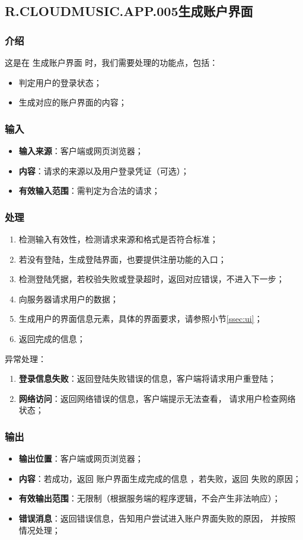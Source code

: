 \subsection{R.CLOUDMUSIC.APP.005生成账户界面}
\subsubsection{介绍}
	这是在 生成账户界面 时，我们需要处理的功能点，包括：
	\begin{itemize}
		\item 判定用户的登录状态；
		\item 生成对应的账户界面的内容；
	\end{itemize}
\subsubsection{输入}
	\begin{itemize}
		\item \textbf{输入来源}：客户端或网页浏览器；
		\item \textbf{内容}：请求的来源以及用户登录凭证（可选）；
		\item \textbf{有效输入范围}：需判定为合法的请求；
	\end{itemize}
\subsubsection{处理}
	\begin{enumerate}
		\item 检测输入有效性，检测请求来源和格式是否符合标准；
		\item 若没有登陆，生成登陆界面，也要提供注册功能的入口；
		\item 检测登陆凭据，若校验失败或登录超时，返回对应错误，不进入下一步；
		\item 向服务器请求用户的数据；
		\item 生成用户的界面信息元素，具体的界面要求，请参照小节\ref{ssec:ui}；
		\item 返回完成的信息；
	\end{enumerate}
	\noindent 异常处理：
	\begin{enumerate}
		\item \textbf{登录信息失败}：返回登陆失败错误的信息，客户端将请求用户重登陆；
		\item \textbf{网络访问}：返回网络错误的信息，客户端提示无法查看，
			请求用户检查网络状态；
	\end{enumerate}
\subsubsection{输出}
\begin{itemize}
	\item \textbf{输出位置}：客户端或网页浏览器；
	\item \textbf{内容}：若成功，返回 账户界面生成完成的信息 ，若失败，返回 失败的原因；
	\item \textbf{有效输出范围}：无限制（根据服务端的程序逻辑，不会产生非法响应）；
	\item \textbf{错误消息}：返回错误信息，告知用户尝试进入账户界面失败的原因，
		并按照情况处理；
\end{itemize}

